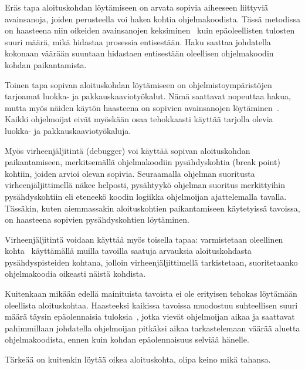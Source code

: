 \documentclass[finnish]{tktltiki2}
\theoremstyle{definition}
\theoremstyle{remark}
\begin{document}
Eräs tapa aloituskohdan löytämiseen on arvata sopivia aiheeseen liittyviä avainsanoja, joiden perusteella voi hakea kohtia ohjelmakoodista. Tässä metodissa on haasteena niin oikeiden avainsanojen keksiminen~\cite{what-to-search-for} kuin epäoleellisten tulosten suuri määrä, mikä hidastaa prosessia entisestään. Haku saattaa johdatella kokonaan väärään suuntaan hidastaen entisestään oleellisen ohjelmakoodin kohdan paikantamista.

Toinen tapa sopivan aloituskohdan löytämiseen on ohjelmistoympäristöjen tarjoamat luokka- ja pakkauskaaviotyökalut. Nämä saattavat nopeuttaa hakua, mutta myös näiden käytön haasteena on sopivien avainsanojen löytäminen~\cite{what-to-search-for}. Kaikki ohjelmoijat eivät myöskään osaa tehokkaasti käyttää tarjolla olevia luokka- ja pakkauskaaviotyökaluja.

Myös virheenjäljitintä (debugger) voi käyttää sopivan aloituskohdan paikantamiseen, merkitsemällä ohjelmakoodiin pysähdyskohtia (break point) kohtiin, joiden arvioi olevan sopivia.
Seuraamalla ohjelman suoritusta virheenjäljittimellä näkee helposti, pysähtyykö ohjelman suoritus merkittyihin pysähdyskohtiin eli eteneekö koodin logiikka ohjelmoijan ajattelemalla tavalla.
Tässäkin, kuten aiemmassakin aloituskohtien paikantamiseen käytetyissä tavoissa, on haasteena sopivien pysähdyskohtien löytäminen.

Virheenjäljitintä voidaan käyttää myös toisella tapaa: varmistetaan oleellinen kohta~\cite{eliciting-design-requirements-for-maintenance-oriented-ides} käyttämällä muilla tavoilla saatuja arvauksia aloituskohdasta pysähdyspisteiden kohtana, jolloin virheenjäljittimellä tarkistetaan, suoritetaanko ohjelmakoodia oikeasti näistä kohdista.

Kuitenkaan mikään edellä mainituista tavoista ei ole erityisen tehokas löytämään oleellista aloituskohtaa. Haasteeksi kaikissa tavoissa muodostuu suhteellisen suuri määrä täysin epäolennaisia tuloksia~\cite{eliciting-design-requirements-for-maintenance-oriented-ides}, jotka vievät ohjelmoijan aikaa ja saattavat pahimmillaan johdatella ohjelmoijan pitkäksi aikaa tarkastelemaan väärää aluetta ohjelmakoodista, ennen kuin kohdan epäolennaisuus selviää hänelle.

Tärkeää on kuitenkin löytää oikea aloituskohta, olipa keino mikä tahansa.


\end{document}
